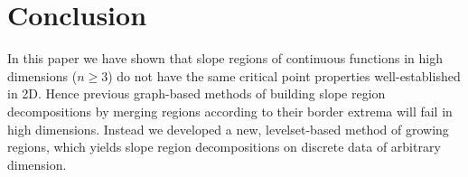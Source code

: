 \documentclass[a4paper,10pt,notitlepage,fullpage]{paper}
\theoremstyle{plain}
\theoremstyle{definition}
\begin{document}
\section{Conclusion}
In this paper we have shown that slope regions of continuous functions in high dimensions ($n\geq 3$) do not have the same critical point properties well-established in 2D.
Hence previous graph-based methods of building slope region decompositions by merging regions according to their border extrema will fail in high dimensions.
Instead we developed a new, levelset-based method of growing regions, which yields slope region decompositions on discrete data of arbitrary dimension.



\end{document}
